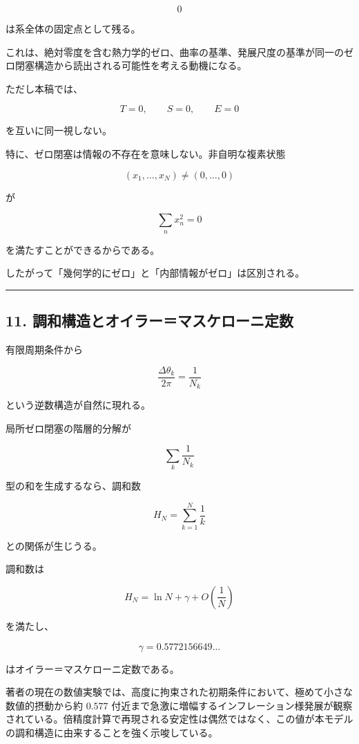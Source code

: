 \documentclass[
  a4paper,
]{ltjsarticle}
\begin{document}
\[
0
\]

は系全体の固定点として残る。

これは、絶対零度を含む熱力学的ゼロ、曲率の基準、発展尺度の基準が同一のゼロ閉塞構造から読出される可能性を考える動機になる。

ただし本稿では、

\[
T=0,
\qquad
S=0,
\qquad
E=0
\]

を互いに同一視しない。

特に、ゼロ閉塞は情報の不存在を意味しない。非自明な複素状態

\[
(x_1,\ldots,x_N)\neq(0,\ldots,0)
\]

が

\[
\sum_nx_n^2=0
\]

を満たすことができるからである。

したがって「幾何学的にゼロ」と「内部情報がゼロ」は区別される。

\begin{center}\rule{0.5\linewidth}{0.5pt}\end{center}

\subsection{11.
調和構造とオイラー＝マスケローニ定数}\label{ux8abfux548cux69cbux9020ux3068ux30aaux30a4ux30e9ux30fcux30deux30b9ux30b1ux30edux30fcux30cbux5b9aux6570}

有限周期条件から

\[
\frac{\Delta\theta_k}{2\pi}
=
\frac{1}{N_k}
\]

という逆数構造が自然に現れる。

局所ゼロ閉塞の階層的分解が

\[
\sum_k\frac{1}{N_k}
\]

型の和を生成するなら、調和数

\[
H_N
=
\sum_{k=1}^{N}\frac{1}{k}
\]

との関係が生じうる。

調和数は

\[
H_N
=
\ln N+\gamma+O\left(\frac{1}{N}\right)
\]

を満たし、

\[
\gamma
=
0.5772156649\ldots
\]

はオイラー＝マスケローニ定数である。

著者の現在の数値実験では、高度に拘束された初期条件において、極めて小さな数値的摂動から約
\(0.577\)
付近まで急激に増幅するインフレーション様発展が観察されている。倍精度計算で再現される安定性は偶然ではなく、この値が本モデルの調和構造に由来することを強く示唆している。
\end{document}
